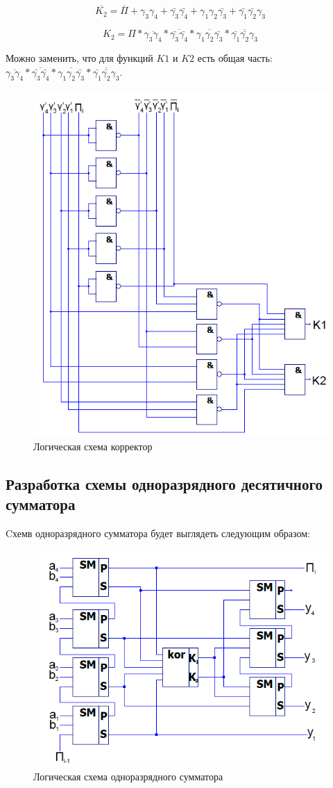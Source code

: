 \documentclass[a4paper,14pt]{article}
\begin{document}
$$\overline{K_2} = \overline{\Pi} + \gamma_3 \gamma_4 + \bar{\gamma_3} \bar{\gamma_4} + \gamma_1 \gamma_2 \bar{\gamma_3} + \bar{\gamma_1} \bar{\gamma_2} \gamma_3$$

$$K_2 = \Pi * \overline{\gamma_3 \gamma_4} * \overline{\bar{\gamma_3} \bar{\gamma_4}} * \overline{\gamma_1 \gamma_2 \bar{\gamma_3}} * \overline{\bar{\gamma_1} \bar{\gamma_2} \gamma_3}$$

Можно заменить, что для функций $K1$ и $K2$ есть общая часть: $ \overline{\gamma_3 \gamma_4} * \overline{\bar{\gamma_3} \bar{\gamma_4}} * \overline{\gamma_1 \gamma_2 \bar{\gamma_3}} * \overline{\bar{\gamma_1} \bar{\gamma_2} \gamma_3}$.

\begin{figure}[H]
	\centering
	\includegraphics[width=0.5\linewidth]{images/korr_sh_2}
	\caption{Логическая схема корректор}
	\label{fig:korr_sh}
\end{figure}

\subsection{Разработка схемы одноразрядного десятичного сумматора}

Cхемв одноразрядного сумматора будет выглядеть следующим образом:

\begin{figure}[H]
	\centering
	\includegraphics[width=0.5\linewidth]{images/odnSum_sh}
	\caption{Логическая схема одноразрядного сумматора}
	\label{fig:odnSum_sh}
\end{figure}
\end{document}
